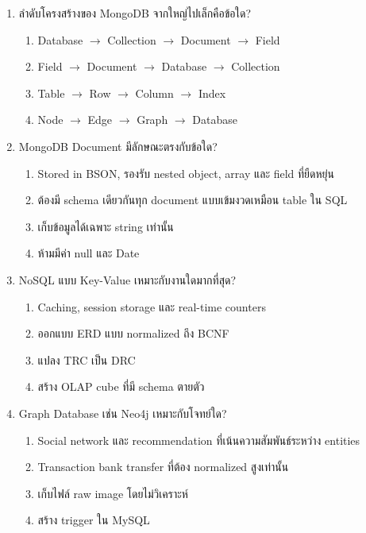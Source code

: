 \documentclass[a4paper,12pt]{article}
\begin{document}
\begin{enumerate}[label=\textbf{\arabic*.}]
    \item ลำดับโครงสร้างของ MongoDB จากใหญ่ไปเล็กคือข้อใด?
    \begin{enumerate}[label=\alph*.]
        \item Database $\rightarrow$ Collection $\rightarrow$ Document $\rightarrow$ Field
        \item Field $\rightarrow$ Document $\rightarrow$ Database $\rightarrow$ Collection
        \item Table $\rightarrow$ Row $\rightarrow$ Column $\rightarrow$ Index
        \item Node $\rightarrow$ Edge $\rightarrow$ Graph $\rightarrow$ Database
    \end{enumerate}

    \item MongoDB Document มีลักษณะตรงกับข้อใด?
    \begin{enumerate}[label=\alph*.]
        \item Stored in BSON, รองรับ nested object, array และ field ที่ยืดหยุ่น
        \item ต้องมี schema เดียวกันทุก document แบบเข้มงวดเหมือน table ใน SQL
        \item เก็บข้อมูลได้เฉพาะ string เท่านั้น
        \item ห้ามมีค่า null และ Date
    \end{enumerate}

    \item NoSQL แบบ Key-Value เหมาะกับงานใดมากที่สุด?
    \begin{enumerate}[label=\alph*.]
        \item Caching, session storage และ real-time counters
        \item ออกแบบ ERD แบบ normalized ถึง BCNF
        \item แปลง TRC เป็น DRC
        \item สร้าง OLAP cube ที่มี schema ตายตัว
    \end{enumerate}

    \item Graph Database เช่น Neo4j เหมาะกับโจทย์ใด?
    \begin{enumerate}[label=\alph*.]
        \item Social network และ recommendation ที่เน้นความสัมพันธ์ระหว่าง entities
        \item Transaction bank transfer ที่ต้อง normalized สูงเท่านั้น
        \item เก็บไฟล์ raw image โดยไม่วิเคราะห์
        \item สร้าง trigger ใน MySQL
    \end{enumerate}


\end{enumerate}
\end{document}
